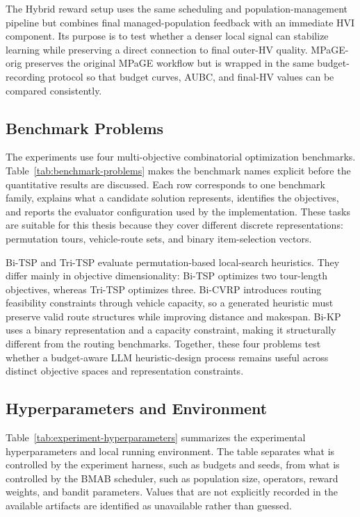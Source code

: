 \documentclass[../main.tex]{subfiles}
\begin{document}
The Hybrid reward setup uses the same scheduling and population-management pipeline but combines final managed-population feedback with an immediate HVI component. Its purpose is to test whether a denser local signal can stabilize learning while preserving a direct connection to final outer-HV quality. MPaGE-orig preserves the original MPaGE workflow but is wrapped in the same budget-recording protocol so that budget curves, AUBC, and final-HV values can be compared consistently.

\subsection{Benchmark Problems}

The experiments use four multi-objective combinatorial optimization benchmarks. Table~\ref{tab:benchmark-problems} makes the benchmark names explicit before the quantitative results are discussed. Each row corresponds to one benchmark family, explains what a candidate solution represents, identifies the objectives, and reports the evaluator configuration used by the implementation. These tasks are suitable for this thesis because they cover different discrete representations: permutation tours, vehicle-route sets, and binary item-selection vectors.



Bi-TSP and Tri-TSP evaluate permutation-based local-search heuristics. They differ mainly in objective dimensionality: Bi-TSP optimizes two tour-length objectives, whereas Tri-TSP optimizes three. Bi-CVRP introduces routing feasibility constraints through vehicle capacity, so a generated heuristic must preserve valid route structures while improving distance and makespan. Bi-KP uses a binary representation and a capacity constraint, making it structurally different from the routing benchmarks. Together, these four problems test whether a budget-aware LLM heuristic-design process remains useful across distinct objective spaces and representation constraints.

\subsection{Hyperparameters and Environment}

Table~\ref{tab:experiment-hyperparameters} summarizes the experimental hyperparameters and local running environment. The table separates what is controlled by the experiment harness, such as budgets and seeds, from what is controlled by the BMAB scheduler, such as population size, operators, reward weights, and bandit parameters. Values that are not explicitly recorded in the available artifacts are identified as unavailable rather than guessed.
\end{document}
